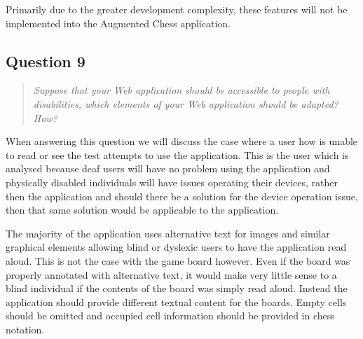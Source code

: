 \documentclass[10pt,a4paper]{report}
\begin{document}
Primarily due to the greater development complexity, these features will not be implemented into the Augmented Chess application.

\subsection*{Question 9}
\begin{quote}
\textit{Suppose that your Web application should be accessible to people with disabilities, which elements of your Web application should be adapted? How?}
\end{quote}

When answering this question we will discuss the case where a user how is unable to read or see the test attempts to use the application. This is the user which is analysed because deaf users will have no problem using the application and physically disabled individuals will have issues operating their devices, rather then the application and should there be a solution for the device operation issue, then that same solution would be applicable to the application.

The majority of the application uses alternative text for images and similar graphical elements allowing blind or dyslexic users to have the application read aloud. This is not the case with the game board however. Even if the board was properly annotated with alternative text, it would make very little sense to a blind individual if the contents of the board was simply read aloud. Instead the application should provide different textual content for the boards. Empty cells should be omitted and occupied cell information should be provided in chess notation.
\end{document}
